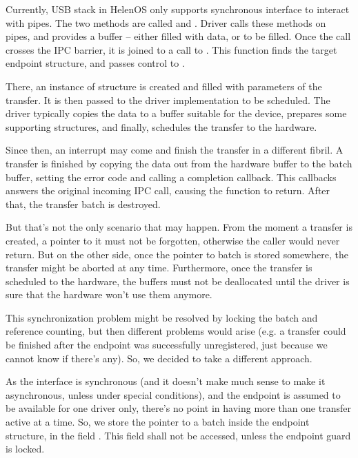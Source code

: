 Currently, USB stack in HelenOS only supports synchronous interface to interact
with pipes. The two methods are called  and .
Driver calls these methods on pipes, and provides a buffer -- either filled
with data, or to be filled. Once the call crosses the IPC barrier, it is joined
to a call to . This function finds the target
endpoint structure, and passes control to .

There, an instance of  structure is created and
filled with parameters of the transfer. It is then passed to the driver
implementation to be scheduled. The driver typically copies the data to
a buffer suitable for the device, prepares some supporting structures, and
finally, schedules the transfer to the hardware.

Since then, an interrupt may come and finish the transfer in a different
fibril. A transfer is finished by copying the data out from the hardware buffer
to the batch buffer, setting the error code and calling a completion callback.
This callbacks answers the original incoming IPC call, causing the 
function to return. After that, the transfer batch is destroyed.

But that's not the only scenario that may happen. From the moment a transfer is
created, a pointer to it must not be forgotten, otherwise the caller would
never return. But on the other side, once the pointer to batch is stored
somewhere, the transfer might be aborted at any time. Furthermore, once the
transfer is scheduled to the hardware, the buffers must not be deallocated
until the driver is sure that the hardware won't use them anymore.

This synchronization problem might be resolved by locking the batch and
reference counting, but then different problems would arise (e.g. a transfer
could be finished after the endpoint was successfully unregistered, just
because we cannot know if there's any). So, we decided to take a different
approach.

As the interface is synchronous (and it doesn't make much sense to make it
asynchronous, unless under special conditions), and the endpoint is assumed to
be available for one driver only, there's no point in having more than one
transfer active at a time. So, we store the pointer to a batch inside the
endpoint structure, in the field . This field shall not be
accessed, unless the endpoint guard is locked.

